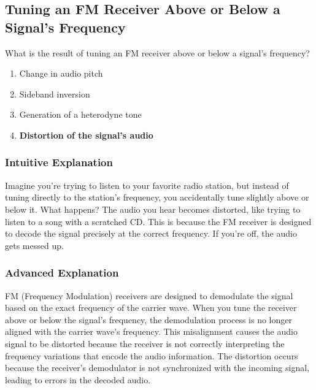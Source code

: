 \subsection{Tuning an FM Receiver Above or Below a Signal’s Frequency}
\label{T4B12}

\begin{tcolorbox}[colback=gray!10!white,colframe=black!75!black,title=T4B12]
What is the result of tuning an FM receiver above or below a signal’s frequency?
\begin{enumerate}[noitemsep]
    \item Change in audio pitch
    \item Sideband inversion
    \item Generation of a heterodyne tone
    \item \textbf{Distortion of the signal’s audio}
\end{enumerate}
\end{tcolorbox}

\subsubsection*{Intuitive Explanation}
Imagine you’re trying to listen to your favorite radio station, but instead of tuning directly to the station’s frequency, you accidentally tune slightly above or below it. What happens? The audio you hear becomes distorted, like trying to listen to a song with a scratched CD. This is because the FM receiver is designed to decode the signal precisely at the correct frequency. If you’re off, the audio gets messed up.

\subsubsection*{Advanced Explanation}
FM (Frequency Modulation) receivers are designed to demodulate the signal based on the exact frequency of the carrier wave. When you tune the receiver above or below the signal’s frequency, the demodulation process is no longer aligned with the carrier wave’s frequency. This misalignment causes the audio signal to be distorted because the receiver is not correctly interpreting the frequency variations that encode the audio information. The distortion occurs because the receiver’s demodulator is not synchronized with the incoming signal, leading to errors in the decoded audio.